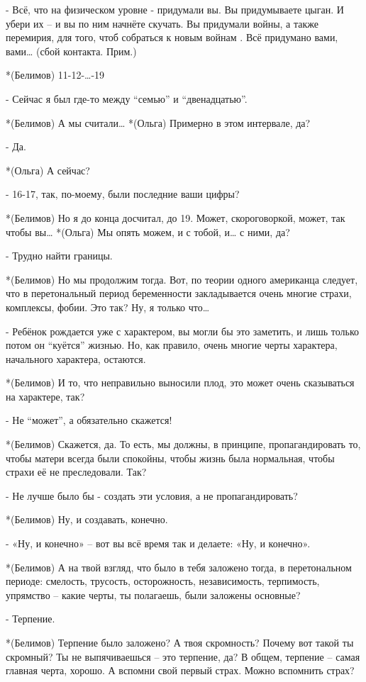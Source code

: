 - Всё, что на физическом уровне - придумали вы. Вы придумываете цыган. И убери их – и вы по ним начнёте скучать. Вы придумали войны, а также перемирия, для того, чтоб собраться к новым войнам . Всё придумано вами, вами…
(сбой контакта. Прим.)

*(Белимов) 11-12-…-19

- Сейчас я  был где-то между “семью” и “двенадцатью”.

*(Белимов) А мы считали…
*(Ольга) Примерно в этом интервале, да?

- Да.

*(Ольга) А сейчас?

- 16-17, так, по-моему, были последние ваши цифры?

*(Белимов) Но я до конца досчитал, до 19. Может, скороговоркой, может, так чтобы вы…
*(Ольга) Мы опять можем, и с тобой, и… с ними, да?

- Трудно найти границы.

*(Белимов) Но мы продолжим тогда. Вот, по теории одного американца следует, что в перетональный период беременности закладывается очень многие страхи, комплексы, фобии. Это так? Ну, я только что…

- Ребёнок рождается уже с характером, вы могли бы это заметить, и лишь только потом он “куётся” жизнью. Но, как правило, очень многие черты характера, начального характера, остаются.

*(Белимов) И то, что неправильно выносили плод, это может очень сказываться на характере, так?

- Не “может”, а обязательно скажется!

*(Белимов) Скажется, да. То есть, мы должны, в принципе, пропагандировать то, чтобы матери всегда были спокойны, чтобы жизнь была нормальная, чтобы страхи её не преследовали. Так?

- Не лучше было бы - создать эти условия, а не пропагандировать? 

*(Белимов) Ну, и создавать, конечно.

- «Ну, и конечно» – вот вы всё время так и делаете: «Ну, и конечно».

*(Белимов) А на твой взгляд, что было в тебя заложено тогда, в перетональном  периоде: смелость, трусость, осторожность, независимость, терпимость, упрямство – какие черты, ты полагаешь, были заложены основные?

- Терпение.

*(Белимов) Терпение было заложено? А твоя скромность? Почему вот такой ты скромный? Ты не выпячиваешься – это терпение, да? В общем, терпение – самая главная черта, хорошо. А вспомни свой первый страх. Можно вспомнить страх? 

